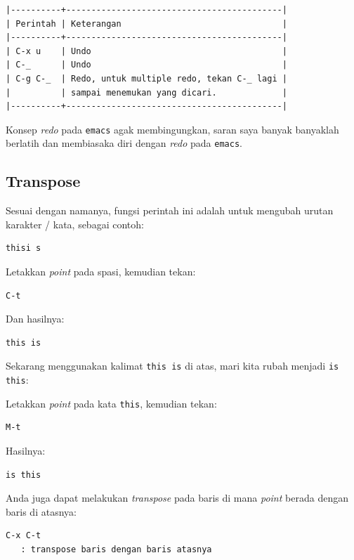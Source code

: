 \documentclass{article}
\begin{document}
\begin{verbatim}
|----------+-------------------------------------------|
| Perintah | Keterangan                                |
|----------+-------------------------------------------|
| C-x u    | Undo                                      |
| C-_      | Undo                                      |
| C-g C-_  | Redo, untuk multiple redo, tekan C-_ lagi |
|          | sampai menemukan yang dicari.             |
|----------+-------------------------------------------|
\end{verbatim}

Konsep \emph{redo} pada \verb=emacs= agak membingungkan, saran saya banyak
banyaklah berlatih dan membiasaka diri dengan \emph{redo} pada \verb=emacs=.

\subsection{Transpose}

Sesuai dengan namanya, fungsi perintah ini adalah untuk mengubah urutan
karakter / kata, sebagai contoh:

\begin{verbatim}
thisi s
\end{verbatim}

Letakkan \emph{point} pada spasi, kemudian tekan:

\begin{verbatim}
C-t
\end{verbatim}

Dan hasilnya:

\begin{verbatim}
this is
\end{verbatim}

Sekarang menggunakan kalimat \verb=this is= di atas, mari kita rubah
menjadi \verb=is this=:

Letakkan \emph{point} pada kata \verb=this=, kemudian tekan:

\begin{verbatim}
M-t
\end{verbatim}

Hasilnya:

\begin{verbatim}
is this
\end{verbatim}

Anda juga dapat melakukan \emph{transpose} pada baris di mana \emph{point}
berada dengan baris di atasnya:

\begin{verbatim}
C-x C-t
   : transpose baris dengan baris atasnya
\end{verbatim}
\end{document}
